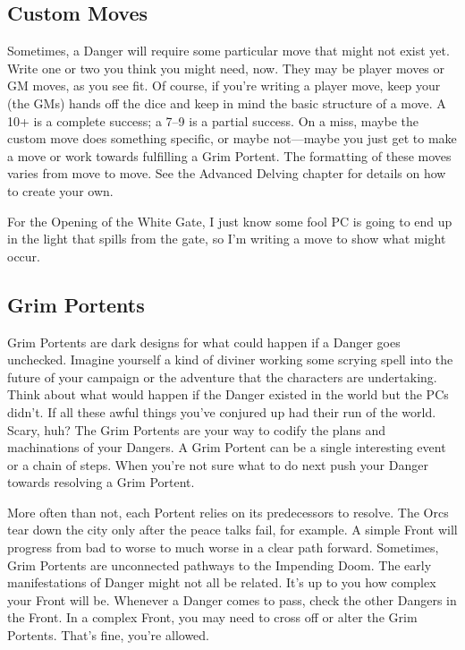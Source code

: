        
\subsection{Custom Moves}    
       

Sometimes, a Danger will require some particular move that might not exist yet. Write one or two you think you might need, now. They may be player moves or GM moves, as you see fit. Of course, if you're writing a player move, keep your (the GMs) hands off the dice and keep in mind the basic structure of a move. A 10+ is a complete success; a 7–9 is a partial success. On a miss, maybe the custom move does something specific, or maybe not—maybe you just get to make a move or work towards fulfilling a Grim Portent. The formatting of these moves varies from move to move. See the Advanced Delving chapter for details on how to create your own. 

       
\startExample
For the Opening of the White Gate, I just know some fool PC is going to end up in the light that spills from the gate, so I'm writing a move to show what might occur.
\stopExample
       
\subsection{Grim Portents}    
       

Grim Portents are dark designs for what could happen if a Danger goes unchecked. Imagine yourself a kind of diviner working some scrying spell into the future of your campaign or the adventure that the characters are undertaking. Think about what would happen if the Danger existed in the world but the PCs didn’t. If all these awful things you’ve conjured up had their run of the world. Scary, huh? The Grim Portents are your way to codify the plans and machinations of your Dangers. A Grim Portent can be a single interesting event or a chain of steps. When you’re not sure what to do next push your Danger towards resolving a Grim Portent.

       

More often than not, each Portent relies on its predecessors to resolve. The Orcs tear down the city only after the peace talks fail, for example. A simple Front will progress from bad to worse to much worse in a clear path forward. Sometimes, Grim Portents are unconnected pathways to the Impending Doom. The early manifestations of Danger might not all be related. It's up to you how complex your Front will be. Whenever a Danger comes to pass, check the other Dangers in the Front. In a complex Front, you may need to cross off or alter the Grim Portents. That's fine, you're allowed.

